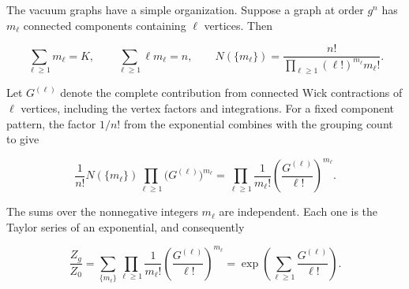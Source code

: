 The vacuum graphs have a simple organization. Suppose a graph at order $g^n$
has $m_\ell$ connected components containing $\ell$ vertices. Then

\begin{equation}
 \sum_{\ell\geq1}m_\ell=K,
 \qquad
 \sum_{\ell\geq1}\ell m_\ell=n,
 \qquad
 N(\{m_\ell\})=
 \frac{n!}{\displaystyle\prod_{\ell\geq1}(\ell!)^{m_\ell}m_\ell!}.
 \label{eq:253a-component-partition}
\end{equation}

Let $G^{(\ell)}$ denote the complete contribution from connected Wick
contractions of $\ell$ vertices, including the vertex factors and integrations.
For a fixed component pattern, the factor $1/n!$ from the exponential combines
with the grouping count to give

\begin{equation}
 \frac{1}{n!}N(\{m_\ell\})
 \prod_{\ell\geq1}\bigl(G^{(\ell)}\bigr)^{m_\ell}
 =\prod_{\ell\geq1}\frac{1}{m_\ell!}
 \left(\frac{G^{(\ell)}}{\ell!}\right)^{m_\ell}.
 \label{eq:253a-component-weight}
\end{equation}

The sums over the nonnegative integers $m_\ell$ are independent. Each one is
the Taylor series of an exponential, and consequently

\begin{equation}
 \frac{Z_g}{Z_0}
 =\sum_{\{m_\ell\}}\prod_{\ell\geq1}\frac{1}{m_\ell!}
 \left(\frac{G^{(\ell)}}{\ell!}\right)^{m_\ell}
 =\exp\left(\sum_{\ell\geq1}\frac{G^{(\ell)}}{\ell!}\right).
 \label{eq:253a-connected-exponentiation}
\end{equation}


